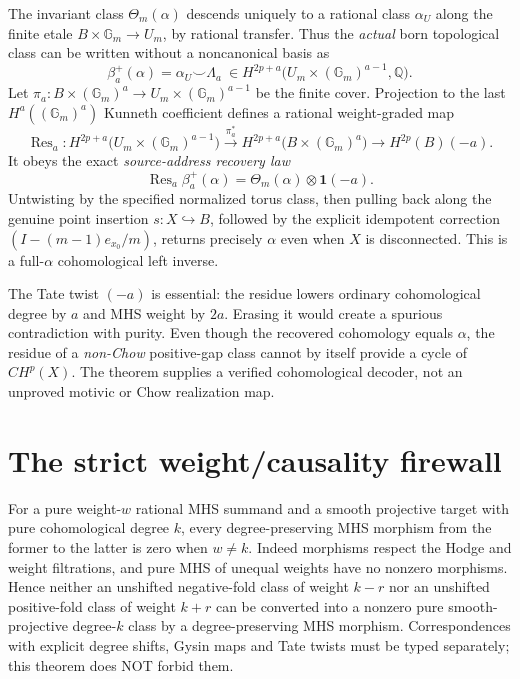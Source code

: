 \documentclass[11pt]{article}
\begin{document}
The invariant class $\Theta_m(\alpha)$ descends uniquely
to a rational class $\alpha_U$ along the finite etale
$B\times\mathbb G_m\to U_m$, by rational transfer.
Thus the \emph{actual} born topological class can be
written without a noncanonical basis as
\[
 \boxed{\qquad
 \beta^+_a(\alpha)=\alpha_U\smile\Lambda_a
    \ \in H^{2p+a}\bigl(U_m\times(\mathbb G_m)^{a-1},
                   \mathbb Q\bigr).
 \qquad}                                                \tag{18}
\]
Let $\pi_a:B\times(\mathbb G_m)^a\to
U_m\times(\mathbb G_m)^{a-1}$ be the finite cover.
Projection to the last $H^a((\mathbb G_m)^a)$ Kunneth
coefficient defines a rational weight-graded map
\[
 \operatorname{Res}_a:
 H^{2p+a}\bigl(U_m\times(\mathbb G_m)^{a-1}\bigr)
 \xrightarrow{\pi_a^*}
 H^{2p+a}\bigl(B\times(\mathbb G_m)^a\bigr)
 \longrightarrow H^{2p}(B)(-a).
\]
It obeys the exact \emph{source-address recovery law}
\[
 \boxed{\quad
 \operatorname{Res}_a\beta^+_a(\alpha)
         =\Theta_m(\alpha)\otimes\mathbf1(-a).
 \quad}                                                \tag{19}
\]
Untwisting by the specified normalized torus class,
then pulling back along the genuine point insertion
$s:X\hookrightarrow B$, followed by the explicit
idempotent correction $(I-(m-1)e_{x_0}/m)$,
returns precisely $\alpha$ even when $X$ is disconnected.
This is a full-$\alpha$ cohomological left inverse.

The Tate twist $(-a)$ is essential: the residue lowers
ordinary cohomological degree by $a$ and MHS weight by
$2a$.  Erasing it would create a spurious contradiction
with purity. Even though the recovered cohomology equals
$\alpha$, the residue of a \emph{non-Chow} positive-gap
class cannot by itself provide a cycle of $CH^p(X)$.
The theorem supplies a verified cohomological decoder,
not an unproved motivic or Chow realization map.

\section{The strict weight/causality firewall}
For a pure weight-$w$ rational MHS summand and a
smooth projective target with pure cohomological
degree $k$, every degree-preserving MHS morphism
from the former to the latter is zero when $w\ne k$.
Indeed morphisms respect the Hodge and weight
filtrations, and pure MHS of unequal weights
have no nonzero morphisms. Hence neither an
unshifted negative-fold class of weight $k-r$
nor an unshifted positive-fold class of weight
$k+r$ can be converted into a nonzero pure
smooth-projective degree-$k$ class by a
degree-preserving MHS morphism.
Correspondences with explicit degree shifts,
Gysin maps and Tate twists must be typed
separately; this theorem does NOT forbid them.
\end{document}
